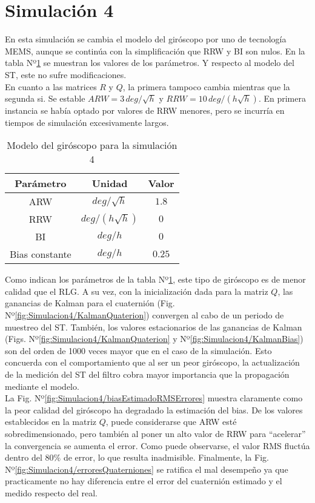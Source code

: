 \documentclass[a4paper,11pt,twoside]{IT-CNEA}
\begin{document}
\section{Simulación 4}
En esta simulación se cambia el modelo del giróscopo por uno de tecnología MEMS, aunque se continúa con la simplificación que RRW y BI son nulos. En la tabla Nº\ref{tabla:modeloGyroRLGSimulacion4} se muestran los valores de los parámetros. Y respecto al modelo del ST, este no sufre modificaciones. 
\\ En cuanto a las matrices  $R$ y $Q$, la primera tampoco cambia mientras que la segunda si. Se estable $ARW=3\,deg/\sqrt{h}$ y $RRW=10\,deg/\left( h\sqrt{h}\right)$. En primera instancia se había optado por valores de RRW menores, pero se incurría en tiempos de simulación excesivamente largos.
\begin{table}[h!]
\centering
\caption{Modelo del giróscopo para la simulación 4}
\label{tabla:modeloGyroRLGSimulacion4}
\begin{tabular}{|c|c|c|}
\hline
Parámetro & Unidad& Valor\\ \hline
ARW&$deg/\sqrt{h}$&$1.8$ \\ \hline
RRW&$deg/\left(h\sqrt{h}\right)$&$0$ \\ \hline
BI&$deg/h$&$0$ \\ \hline
Bias constante&$deg/h$&$0.25$ \\ \hline
\end{tabular}
\end{table}
\par Como indican los parámetros de la tabla Nº\ref{tabla:modeloGyroRLGSimulacion4}, este tipo de giróscopo es de menor calidad que el RLG. A su vez, con la inicialización dada para la matriz $Q$, las ganancias de Kalman para el cuaternión (Fig. Nº\ref{fig:Simulacion4/KalmanQuaterion}) convergen al cabo de un periodo de muestreo del ST. También, los valores estacionarios de las ganancias de Kalman (Figs. Nº\ref{fig:Simulacion4/KalmanQuaterion} y Nº\ref{fig:Simulacion4/KalmanBias}) son del orden de 1000 veces mayor que en el caso de la simulación. Esto concuerda con el comportamiento que al ser un peor giróscopo, la actualización de la medición del ST del filtro cobra mayor importancia que la propagación mediante el modelo. 
\\ La Fig. Nº\ref{fig:Simulacion4/biasEstimadoRMSErrores} muestra claramente como la peor calidad del giróscopo ha degradado la estimación del bias. De los valores establecidos en la matriz $Q$, puede considerarse que ARW esté sobredimensionado, pero también al poner un alto valor de RRW para ``acelerar'' la convergencia se aumenta el error. Como puede observarse, el valor RMS fluctúa dentro del $80\%$ de error, lo que resulta inadmisible. Finalmente, la Fig. Nº\ref{fig:Simulacion4/erroresQuaterniones} se ratifica el mal desempeño ya que practicamente no hay diferencia entre el error del cuaternión estimado y el medido respecto del real. 
\end{document}
